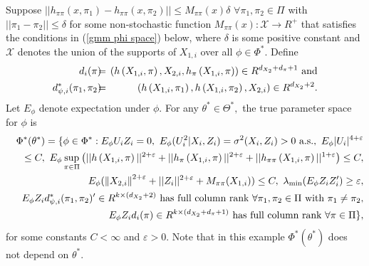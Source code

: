 \documentclass[12pt,titlepage,final,oneside,letterpaper]{article}
\begin{document}
Suppose $||h_{\pi \pi }(x,\pi _{1})-h_{\pi \pi }(x,\pi _{2})||\leq M_{\pi
\pi }(x)\delta $ $\forall \pi _{1},\pi _{2}\in \Pi $ with $||\pi _{1}-\pi
_{2}||\leq \delta $ for some non-stochastic function $M_{\pi \pi }(x):%
\mathcal{X}\rightarrow R^{+}$ that satisfies the conditions in (\ref{gmm phi
space}) below, where $\delta $ is some positive constant and $\mathcal{X}$
denotes the union of the supports of $X_{1,i}$ over all $\phi \in \Phi
^{\ast }.$ Define%
\begin{eqnarray}
d_{i}(\pi )\hspace{-0.08in} &=&\hspace{-0.08in}(h\left( X_{1,i},\pi \right)
,X_{2,i},h_{\pi }\left( X_{1,i},\pi \right) )\in R^{d_{X_{2}}+d_{\pi }+1}%
\text{ and}  \notag \\
d_{\psi ,i}^{\ast }(\pi _{1},\pi _{2})\hspace{-0.08in} &=&\hspace{-0.08in}%
(h\left( X_{1,i},\pi _{1}\right) ,h\left( X_{1,i},\pi _{2}\right)
,X_{2,i})\in R^{d_{X_{2}}+2}.
\end{eqnarray}%
Let $E_{\phi }$ denote expectation under $\phi .$ For any $\theta ^{\ast
}\in \Theta ^{\ast },$ the true parameter space for $\phi $ is 
\begin{eqnarray}
&&\Phi ^{\ast }(\theta ^{\ast })\overset{}{=}\{\phi \overset{}{\in }\Phi
^{\ast }:E_{\phi }U_{i}Z_{i}\overset{}{=}0,\text{ }E_{\phi
}(U_{i}^{2}|X_{i},Z_{i})=\sigma ^{2}(X_{i},Z_{i})>0\text{ a.s.},\text{ }%
E_{\phi }|U_{i}|^{4+\varepsilon }  \notag \\
&&\overset{}{\leq }C,\text{ }E_{\phi }\sup_{\pi \in \Pi }\left( ||h\left(
X_{1,i},\pi \right) ||^{2+\varepsilon }+||h_{\pi }\left( X_{1,i},\pi \right)
||^{2+\varepsilon }+||h_{\pi \pi }\left( X_{1,i},\pi \right)
||^{1+\varepsilon }\right) \overset{}{\leq }C,  \notag \\
&&E_{\phi }(\left\Vert X_{2,i}\right\Vert ^{2+\varepsilon
}+||Z_{i}||^{2+\varepsilon }+M_{\pi \pi }(X_{1,i}))\overset{}{\leq }C,\text{ 
}\lambda _{\min }(E_{\phi }Z_{i}Z_{i}^{\prime })\geq \varepsilon ,  \notag \\
&&E_{\phi }Z_{i}d_{\psi ,i}^{\ast }(\pi _{1},\pi _{2})^{\prime }\in
R^{k\times (d_{X_{2}}+2)}\text{ has full column rank }\forall \pi _{1},\pi
_{2}\overset{}{\in }\Pi \text{ with }\pi _{1}\overset{}{\neq }\pi _{2}, 
\notag \\
&&E_{\phi }Z_{i}d_{i}(\pi )\in R^{k\times (d_{X_{2}}+d_{\pi }+1)}\text{ has
full column rank }\forall \pi \overset{}{\in }\Pi \},  \label{gmm phi space}
\end{eqnarray}%
for some constants $C<\infty $ and $\varepsilon >0.$ Note that in this
example $\Phi ^{\ast }(\theta ^{\ast })$ does not depend on $\theta ^{\ast
}. $
\end{document}
